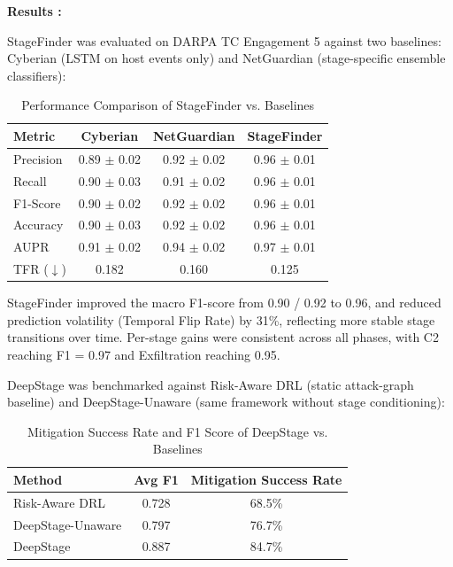 \textbf{Results \cite{phan2026learning, phan2026deepstage}:}

StageFinder was evaluated on DARPA TC Engagement 5 against two baselines: Cyberian (LSTM on host events only) and NetGuardian (stage-specific ensemble classifiers):

\begin{table}[H]
    \centering
    \caption{Performance Comparison of StageFinder vs. Baselines \protect\cite{phan2026learning}}
    \begin{tabular}{|l|c|c|c|}
        \hline
        \textbf{Metric} & \textbf{Cyberian} & \textbf{NetGuardian} & \textbf{StageFinder} \\
        \hline
        Precision & 0.89 $\pm$ 0.02 & 0.92 $\pm$ 0.02 & 0.96 $\pm$ 0.01 \\
        Recall & 0.90 $\pm$ 0.03 & 0.91 $\pm$ 0.02 & 0.96 $\pm$ 0.01 \\
        F1-Score & 0.90 $\pm$ 0.02 & 0.92 $\pm$ 0.02 & 0.96 $\pm$ 0.01 \\
        Accuracy & 0.90 $\pm$ 0.03 & 0.92 $\pm$ 0.02 & 0.96 $\pm$ 0.01 \\
        AUPR & 0.91 $\pm$ 0.02 & 0.94 $\pm$ 0.02 & 0.97 $\pm$ 0.01 \\
        TFR ($\downarrow$) & 0.182 & 0.160 & 0.125 \\
        \hline
    \end{tabular}
\end{table}

StageFinder improved the macro F1-score from 0.90 / 0.92 to 0.96, and reduced prediction volatility (Temporal Flip Rate) by 31\%, reflecting more stable stage transitions over time. Per-stage gains were consistent across all phases, with C2 reaching F1 = 0.97 and Exfiltration reaching 0.95.

DeepStage was benchmarked against Risk-Aware DRL (static attack-graph baseline) and DeepStage-Unaware (same framework without stage conditioning):

\begin{table}[H]
    \centering
    \caption{Mitigation Success Rate and F1 Score of DeepStage vs. Baselines \protect\cite{phan2026deepstage}}
    \begin{tabular}{|l|c|c|}
        \hline
        \textbf{Method} & \textbf{Avg F1} & \textbf{Mitigation Success Rate} \\
        \hline
        Risk-Aware DRL & 0.728 & 68.5\% \\
        DeepStage-Unaware & 0.797 & 76.7\% \\
        DeepStage & 0.887 & 84.7\% \\
        \hline
    \end{tabular}
\end{table}

